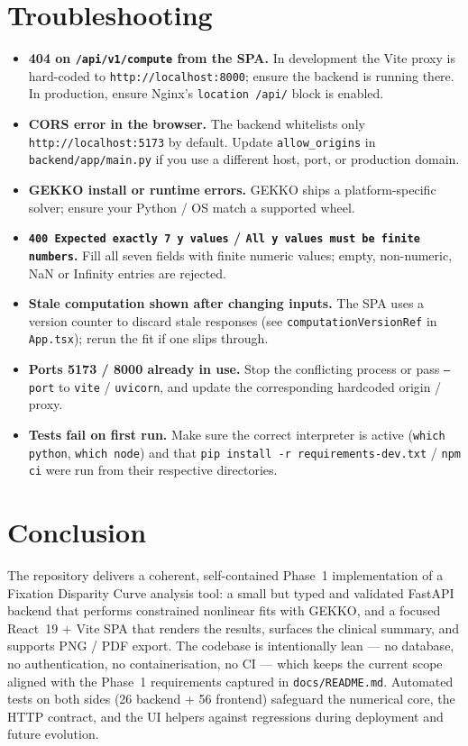 \documentclass[11pt,a4paper]{article}
\begin{document}
\section{Troubleshooting}
\label{sec:trouble}

\begin{itemize}[leftmargin=1.2em]
  \item \textbf{404 on \texttt{/api/v1/compute} from the SPA.} In development
        the Vite proxy is hard-coded to \texttt{http://localhost:8000};
        ensure the backend is running there. In production, ensure
        Nginx's \texttt{location /api/} block is enabled.
  \item \textbf{CORS error in the browser.} The backend whitelists only
        \texttt{http://localhost:5173} by default. Update
        \texttt{allow\_origins} in \texttt{backend/app/main.py} if you use a
        different host, port, or production domain.
  \item \textbf{GEKKO install or runtime errors.} GEKKO ships a
        platform-specific solver; ensure your Python / OS match a supported
        wheel.
  \item \textbf{\texttt{400 Expected exactly 7 y values} /
        \texttt{All y values must be finite numbers}.} Fill all seven fields
        with finite numeric values; empty, non-numeric, NaN or Infinity
        entries are rejected.
  \item \textbf{Stale computation shown after changing inputs.} The SPA uses
        a version counter to discard stale responses (see
        \texttt{computationVersionRef} in \texttt{App.tsx}); rerun the fit
        if one slips through.
  \item \textbf{Ports 5173 / 8000 already in use.} Stop the conflicting
        process or pass \texttt{--port} to \texttt{vite} / \texttt{uvicorn},
        and update the corresponding hardcoded origin / proxy.
  \item \textbf{Tests fail on first run.} Make sure the correct interpreter
        is active (\texttt{which python}, \texttt{which node}) and that
        \texttt{pip install -r requirements-dev.txt} / \texttt{npm ci} were
        run from their respective directories.
\end{itemize}

\section{Conclusion}
\label{sec:conclusion}

The repository delivers a coherent, self-contained Phase~1 implementation of
a Fixation Disparity Curve analysis tool: a small but typed and validated
FastAPI backend that performs constrained nonlinear fits with GEKKO, and a
focused React~19 + Vite SPA that renders the results, surfaces the clinical
summary, and supports PNG / PDF export. The codebase is intentionally lean
--- no database, no authentication, no containerisation, no CI --- which
keeps the current scope aligned with the Phase~1 requirements captured in
\texttt{docs/README.md}. Automated tests on both sides (26 backend + 56
frontend) safeguard the numerical core, the HTTP contract, and the UI
helpers against regressions during deployment and future evolution.
\end{document}
